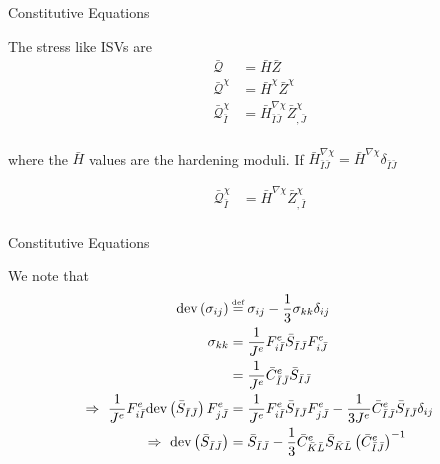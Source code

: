 \documentclass[11pt]{beamer}
\newcommand\defeq{\mathrel{\stackrel{\makebox[0pt]{\mbox{\normalfont\tiny def}}}{=}}}
\newcommand{\dev}[1]{\text{dev}\left(#1\right)}
\begin{document}
\begin{frame}{Constitutive Equations}

The stress like ISVs are
\begin{align*}
\bar{\mathcal{Q}} &= \bar{H} \bar{Z}\\
\bar{\mathcal{Q}}^{\chi} &= \bar{H}^{\chi} \bar{Z}^{\chi}\\
\bar{\mathcal{Q}}_{\bar{I}}^{\chi} &= \bar{H}_{\bar{I}\bar{J}}^{\nabla \chi} \bar{Z}_{,\bar{J}}^{\chi}\\
\end{align*}

where the $\bar{H}$ values are the hardening moduli. If $\bar{H}_{\bar{I}\bar{J}}^{\nabla \chi} = \bar{H}^{\nabla \chi} \delta_{\bar{I}\bar{J}}$

\begin{align*}
\bar{\mathcal{Q}}_{\bar{I}}^{\chi} &= \bar{H}^{\nabla \chi} \bar{Z}_{,\bar{I}}^{\chi}\\
\end{align*}

\end{frame}

\begin{frame}{Constitutive Equations}

We note that
\begin{align*}
\dev{\sigma_{ij}} &\defeq \sigma_{ij} - \frac{1}{3} \sigma_{kk} \delta_{ij}\\
\sigma_{kk} &= \frac{1}{J^e} F_{i\bar{I}}^e \bar{S}_{\bar{I}\bar{J}} F_{i\bar{J}}^e\\
&= \frac{1}{J^e} \bar{C}_{\bar{I}\bar{J}}^e \bar{S}_{\bar{I}\bar{J}}\\
\Rightarrow\ \frac{1}{J^e} F_{i\bar{I}}^e \dev{\bar{S}_{\bar{I}\bar{J}}} F_{j\bar{J}}^e &=  \frac{1}{J^e} F_{i\bar{I}}^e \bar{S}_{\bar{I}\bar{J}} F_{j\bar{J}}^e - \frac{1}{3J^e} \bar{C}_{\bar{I}\bar{J}}^e \bar{S}_{\bar{I}\bar{J}} \delta_{ij}\\
\Rightarrow\ \dev{\bar{S}_{\bar{I}\bar{J}}} &= \bar{S}_{\bar{I}\bar{J}} - \frac{1}{3} \bar{C}_{\bar{K}\bar{L}}^e \bar{S}_{\bar{K}\bar{L}} \left(\bar{C}_{\bar{I}\bar{J}}^e\right)^{-1}\\ 
\end{align*}

\end{frame}
\end{document}
